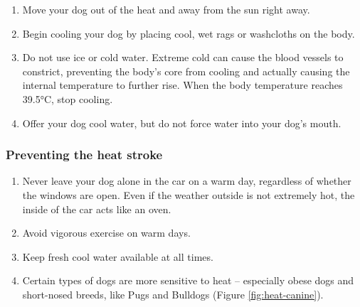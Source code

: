 \documentclass[]{book}
\providecommand{\tightlist}{%
  \setlength{\itemsep}{0pt}\setlength{\parskip}{0pt}}
\begin{document}
\begin{enumerate}
\def\labelenumi{\arabic{enumi}.}
\tightlist
\item
  Move your dog out of the heat and away from the sun right away.\\
\item
  Begin cooling your dog by placing cool, wet rags or washcloths on the
  body.\\
\item
  Do not use ice or cold water. Extreme cold can cause the blood vessels
  to constrict, preventing the body's core from cooling and actually
  causing the internal temperature to further rise. When the body
  temperature reaches 39.5°C, stop cooling.
\item
  Offer your dog cool water, but do not force water into your dog's
  mouth.
\end{enumerate}

\subsubsection{Preventing the heat
stroke}\label{preventing-the-heat-stroke}

\begin{enumerate}
\def\labelenumi{\arabic{enumi}.}
\tightlist
\item
  Never leave your dog alone in the car on a warm day, regardless of
  whether the windows are open. Even if the weather outside is not
  extremely hot, the inside of the car acts like an oven.\\
\item
  Avoid vigorous exercise on warm days.\\
\item
  Keep fresh cool water available at all times.\\
\item
  Certain types of dogs are more sensitive to heat -- especially obese
  dogs and short-nosed breeds, like Pugs and Bulldogs (Figure
  \ref{fig:heat-canine}).
\end{enumerate}
\end{document}
